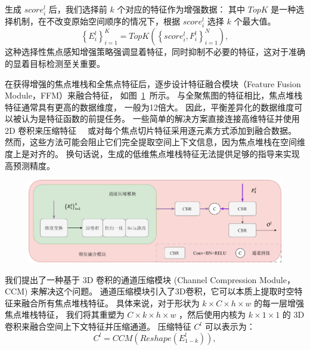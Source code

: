 %
%
%
%
\par
%
%
生成 $ score_{i}^{l} $ 后，我们选择前 $k$ 个对应的特征作为增强数据：
其中 $ TopK $ 是一种选择机制，在不改变原始空间顺序的情况下，根据 $ score_{i}^{l} $ 选择 $k$ 个最大值。 
\begin{equation}
	\left \{ E_{i}^{l} \right \}_{i=1}^{K} = TopK \left ( \left \{ score_{i}^{l}, F_{i}^{l} \right \}_{i=1}^{N} \right ), 	
\end{equation}
%
%
这种选择性焦点感知增强策略强调显着特征，同时抑制不必要的特征，这对于准确的显着目标检测至关重要。
%
%
%
%
\par
%
%
在获得增强的焦点堆栈和全焦点特征后，逐步设计特征融合模块（Feature Fusion Module，FFM）来融合特征，
如图~\ref{cpt3_fig1:ccm}~所示。
与全聚焦图的特征相比，焦点堆栈特征通常具有更高的数据维度， 一般为12倍大。 
因此，平衡差异化的数据维度可以被认为是特征函数的前提任务。
一些简单的解决方案直接连接高维特征并使用 2D 卷积来压缩特征~\cite{piao2021panet}~
或对每个焦点切片特征采用逐元素方式添加到融合数据\cite{liu2021light}。 然而，这些方法可能会阻止它们完全提取空间上下文信息，因为焦点堆栈在空间维度上是对齐的。 换句话说，生成的低维焦点堆栈特征无法提供足够的指导来实现高预测精度。 
%
%
%
%
%
\begin{figure}[!ht]
	\centering
	\includegraphics[width=0.95\linewidth]{figures/chapter3/ccm}
	\label{cpt3_fig1:ccm}
\end{figure}
%
%
%
\par
%
%
我们提出了一种基于 3D 卷积的通道压缩模块 (Channel Compression Module，CCM) 来解决这个问题。 
通道压缩模块引入了3D卷积，它可以本质上提取时空特征来融合所有焦点堆栈特征。
具体来说，对于形状为 $ k \times C \times h \times w $ 的每一层增强焦点堆栈特征，
我们将其重塑为 $ C \times  k \times  h \times w $ ，然后使用内核为 $ k \times 1 \times 1 $  的 3D 卷积来融合空间上下文特征并压缩通道。 压缩特征 $ C^{l} $ 可以表示为：
%
%
\begin{equation}
	C^{l} = CCM \left ( Reshape \left ( E_{1-k}^{l} \right ) \right ) ,
\end{equation}
